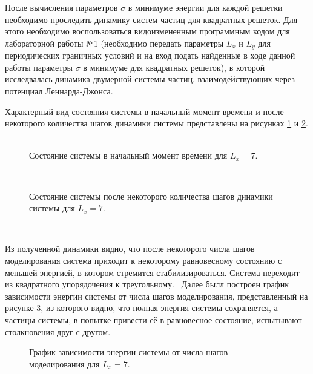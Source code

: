 \documentclass[14pt,a4paper,report]{ncc}
\begin{document}
После вычисления параметров $\sigma$ в минимуме энергии для каждой решетки необходимо проследить динамику систем частиц для квадратных решеток. Для этого необходимо воспользоваться видоизмененным программным кодом для лабораторной работы №1 (необходимо передать параметры $L_x$ и $L_y$ для периодических граничных условий и на вход подать найденные в ходе данной работы параметры $\sigma$ в минимуме для квадратных решеток), в которой исследвалась динамика двумерной системы частиц, взаимодействующих через потенциал Леннарда-Джонса.
\

Характерный вид состояния системы в начальный момент времени и после некоторого количества шагов динамики системы представлены на рисунках \ref{ris:image6} и \ref{ris:image7}. 
\
\begin{figure}[h]
\caption{Состояние системы в начальный момент времени для $L_x=7$.}
\label{ris:image6}
\end{figure}
\

\begin{figure}[h]
\caption{Состояние системы после некоторого количества шагов динамики системы для $L_x=7$.}
\label{ris:image7}
\end{figure}
\

Из полученной динамики видно, что после некоторого числа шагов моделирования система приходит к некоторому равновесному состоянию с меньшей энергией, в котором стремится стабилизироваться. Система переходит из квадратного упорядочения к треугольному.
\
Далее былл построен график зависимости энергии системы от числа шагов моделирования, представленный на рисунке \ref{ris:image8}, из которого видно, что полная энергия системы сохраняется, а частицы системы, в попытке привести её в равновесное состояние, испытывают столкновения друг с другом.
\

\begin{figure}[t!]
\caption{График зависимости энергии системы от числа шагов моделирования для $L_x=7$.}
\label{ris:image8}
\end{figure}
\
\end{document}
